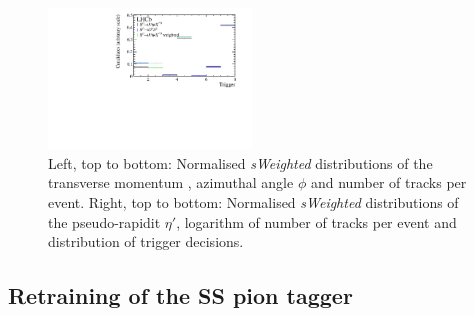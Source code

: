 \begin{figure}[tbp]
    \includegraphics[width=0.48\textwidth]{09FlavourTagging/figs/Trigger_weighted.pdf}
    \caption{Left, top to bottom: Normalised \emph{sWeighted} distributions of the transverse momentum \pt, azimuthal angle $\phi$ and number of tracks per event.
    Right, top to bottom: Normalised \emph{sWeighted} distributions of the pseudo-rapidit $\eta'$, logarithm of number of tracks per event and distribution of trigger decisions.}
    \label{fig:reweightingSS}
\end{figure}

\subsection{Retraining of the SS pion tagger}
\label{sec:retrainSSpion}

